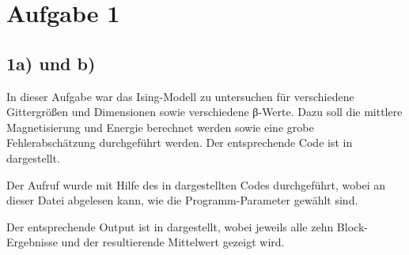 \section*{Aufgabe 1}
\subsection*{1a) und b)}
In dieser Aufgabe war das Ising-Modell zu untersuchen für verschiedene Gittergrößen
und Dimensionen sowie verschiedene β-Werte. Dazu soll die mittlere Magnetisierung 
und Energie berechnet werden sowie eine grobe Fehlerabschätzung durchgeführt werden.
Der entsprechende Code ist in  dargestellt.



Der Aufruf wurde mit Hilfe des in  dargestellten Codes durchgeführt,
wobei an dieser Datei abgelesen kann, wie die Programm-Parameter gewählt sind.



Der entsprechende Output ist in  dargestellt, wobei jeweils alle
zehn Block-Ergebnisse und der resultierende Mittelwert gezeigt wird.

